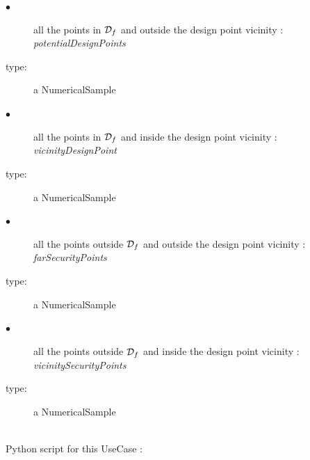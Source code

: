              {
               \begin{description}
               \item[$\bullet$] all the points in ${\mathcal D}_f$ and outside the design point vicinity : {\em potentialDesignPoints}
               \item[type:] a NumericalSample
               \item[$\bullet$] all the points in ${\mathcal D}_f$ and inside the design point vicinity : {\em vicinityDesignPoint}
               \item[type:] a NumericalSample
               \item[$\bullet$] all the points outside ${\mathcal D}_f$ and outside the design point vicinity : {\em farSecurityPoints}
               \item[type:] a NumericalSample
               \item[$\bullet$] all the points outside ${\mathcal D}_f$ and inside the design point vicinity : {\em vicinitySecurityPoints}
               \item[type:] a NumericalSample
               \end{description}
             }

             \textspace\\

             Python script for this UseCase :

